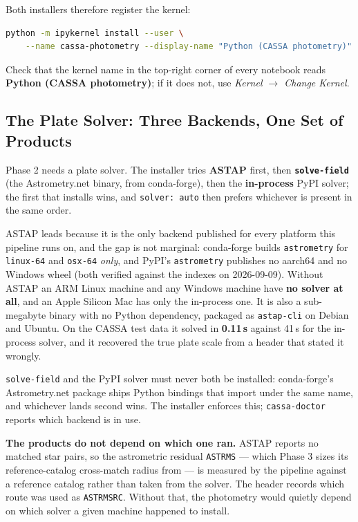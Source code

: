 \documentclass[11pt,a4paper]{article}
\begin{document}
Both installers therefore register the kernel:
\begin{lstlisting}[language=bash]
python -m ipykernel install --user \
    --name cassa-photometry --display-name "Python (CASSA photometry)"
\end{lstlisting}

Check that the kernel name in the top-right corner of every notebook reads
\textbf{Python (CASSA photometry)}; if it does not, use \emph{Kernel
$\rightarrow$ Change Kernel}.

\subsection{The Plate Solver: Three Backends, One Set of Products}
\begin{mdframed}[backgroundcolor=masterbg, linecolor=primary, linewidth=1.5pt, roundcorner=4pt]
Phase 2 needs a plate solver. The installer tries \textbf{ASTAP} first, then
\textbf{\texttt{solve-field}} (the Astrometry.net binary, from conda-forge),
then the \textbf{in-process} PyPI solver; the first that installs wins, and
\texttt{solver: auto} then prefers whichever is present in the same order.

ASTAP leads because it is the only backend published for every platform this
pipeline runs on, and the gap is not marginal: conda-forge builds
\texttt{astrometry} for \texttt{linux-64} and \texttt{osx-64} \emph{only}, and
PyPI's \texttt{astrometry} publishes no aarch64 and no Windows wheel (both
verified against the indexes on 2026-09-09). Without ASTAP an ARM Linux machine
and any Windows machine have \textbf{no solver at all}, and an Apple Silicon Mac
has only the in-process one. It is also a sub-megabyte binary with no Python
dependency, packaged as \texttt{astap-cli} on Debian and Ubuntu. On the CASSA test data it solved
in \textbf{0.11\,s} against 41\,s for the in-process solver, and it recovered the
true plate scale from a header that stated it wrongly.

\texttt{solve-field} and the PyPI solver must never both be installed:
conda-forge's Astrometry.net package ships Python bindings that import under the
same name, and whichever lands second wins. The installer enforces this;
\texttt{cassa-doctor} reports which backend is in use.

\textbf{The products do not depend on which one ran.} ASTAP reports no matched
star pairs, so the astrometric residual \texttt{ASTRMS} --- which Phase 3 sizes
its reference-catalog cross-match radius from --- is measured by the pipeline
against a reference catalog rather than taken from the solver. The header
records which route was used as \texttt{ASTRMSRC}. Without that, the photometry
would quietly depend on which solver a given machine happened to install.
\end{mdframed}
\end{document}
